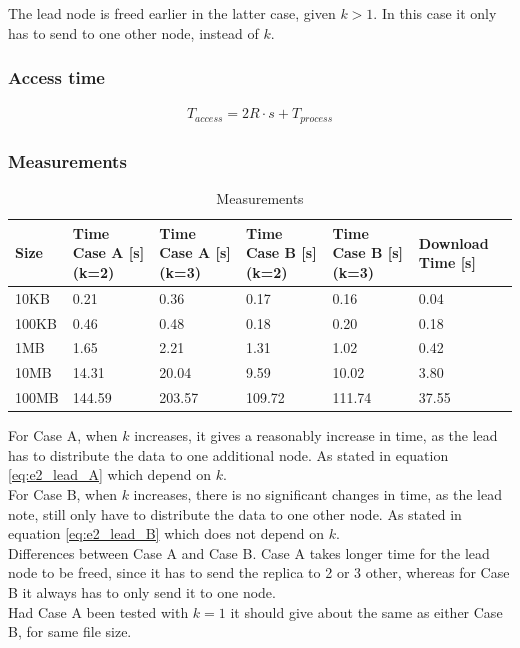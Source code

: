 The lead node is freed earlier in the latter case, given $k > 1$. In this case it only has to send to one other node, instead of $k$.

\subsubsection*{Access time}
\begin{align}
    T_{access} = 2R \cdot s + T_{process}
\end{align}

\subsubsection*{Measurements}
\begin{table}[H]
    \begin{tabularx}{\textwidth}{|X|X|X|X|X|X|}
        \hline
        \cellcolor{lightgray}\textbf{Size} & \cellcolor{lightgray}\textbf{Time Case A [s] (k=2)} & \cellcolor{lightgray}\textbf{Time Case A [s] (k=3)} & \cellcolor{lightgray}\textbf{Time Case B [s] (k=2)} & \cellcolor{lightgray}\textbf{Time Case B [s] (k=3)} & \cellcolor{lightgray}\textbf{Download Time [s]}\\\hline
        10KB  & 0.21    & 0.36   & 0.17   & 0.16   & 0.04  \\\hline
        100KB & 0.46    & 0.48   & 0.18   & 0.20   & 0.18  \\\hline
        1MB   & 1.65    & 2.21   & 1.31   & 1.02   & 0.42  \\\hline
        10MB  & 14.31   & 20.04  & 9.59   & 10.02  & 3.80  \\\hline
        100MB & 144.59  & 203.57 & 109.72 & 111.74 & 37.55 \\\hline
    \end{tabularx}
    \caption{Measurements}
	\label{tab:e2meas}
\end{table}

For Case A, when $k$ increases, it gives a reasonably increase in time, as the lead has to distribute the data to one additional node. As stated in equation \ref{eq:e2_lead_A} which depend on $k$.\\
For Case B, when $k$ increases, there is no significant changes in time, as the lead note, still only have to distribute the data to one other node. As stated in equation \ref{eq:e2_lead_B} which does not depend on $k$.\\
Differences between Case A and Case B. Case A takes longer time for the lead node to be freed, since it has to send the replica to 2 or 3 other, whereas for Case B it always has to only send it to one node.\\
Had Case A been tested with $k=1$ it should give about the same as either Case B, for same file size.
